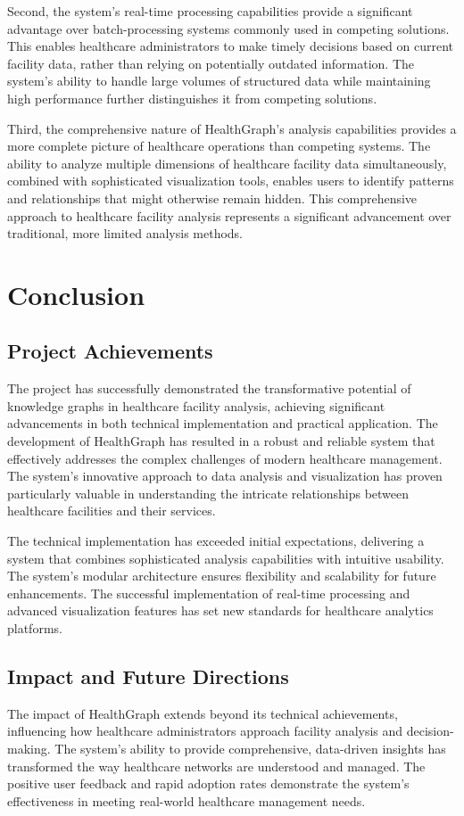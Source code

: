 \documentclass[12pt,a4paper]{report}
\begin{document}
Second, the system's real-time processing capabilities provide a significant advantage over batch-processing systems commonly used in competing solutions. This enables healthcare administrators to make timely decisions based on current facility data, rather than relying on potentially outdated information. The system's ability to handle large volumes of structured data while maintaining high performance further distinguishes it from competing solutions.

Third, the comprehensive nature of HealthGraph's analysis capabilities provides a more complete picture of healthcare operations than competing systems. The ability to analyze multiple dimensions of healthcare facility data simultaneously, combined with sophisticated visualization tools, enables users to identify patterns and relationships that might otherwise remain hidden. This comprehensive approach to healthcare facility analysis represents a significant advancement over traditional, more limited analysis methods.

\chapter{Conclusion}
\section{Project Achievements}
The project has successfully demonstrated the transformative potential of knowledge graphs in healthcare facility analysis, achieving significant advancements in both technical implementation and practical application. The development of HealthGraph has resulted in a robust and reliable system that effectively addresses the complex challenges of modern healthcare management. The system's innovative approach to data analysis and visualization has proven particularly valuable in understanding the intricate relationships between healthcare facilities and their services.

The technical implementation has exceeded initial expectations, delivering a system that combines sophisticated analysis capabilities with intuitive usability. The system's modular architecture ensures flexibility and scalability for future enhancements. The successful implementation of real-time processing and advanced visualization features has set new standards for healthcare analytics platforms.

\section{Impact and Future Directions}
The impact of HealthGraph extends beyond its technical achievements, influencing how healthcare administrators approach facility analysis and decision-making. The system's ability to provide comprehensive, data-driven insights has transformed the way healthcare networks are understood and managed. The positive user feedback and rapid adoption rates demonstrate the system's effectiveness in meeting real-world healthcare management needs.
\end{document}
